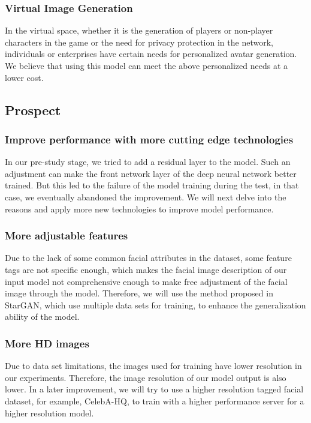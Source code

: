 \subsubsection*{Virtual Image Generation}
In the virtual space, whether it is the generation of players or non-player characters in the game or the need for privacy protection in the network, individuals or enterprises have certain needs for personalized avatar generation.
We believe that using this model can meet the above personalized needs at a lower cost.

\subsection{Prospect}
\subsubsection*{Improve performance with more cutting edge technologies}

In our pre-study stage, we tried to add a residual layer to the model.
Such an adjustment can make the front network layer of the deep neural network better trained.
But this led to the failure of the model training during the test, in that case, we eventually abandoned the improvement.
We will next delve into the reasons and apply more new technologies to improve model performance.


\subsubsection*{More adjustable features}

Due to the lack of some common facial attributes in the dataset, some feature tags are not specific enough, which makes the facial image description of our input model not comprehensive enough to make free adjustment of the facial image through the model.
Therefore, we will use the method proposed in StarGAN, which use multiple data sets for training, to enhance the generalization ability of the model.


\subsubsection*{More HD images}
Due to data set limitations, the images used for training have lower resolution in our experiments.
Therefore, the image resolution of our model output is also lower.
In a later improvement, we will try to use a higher resolution tagged facial dataset, for example, CelebA-HQ, to train with a higher performance server for a higher resolution model.
